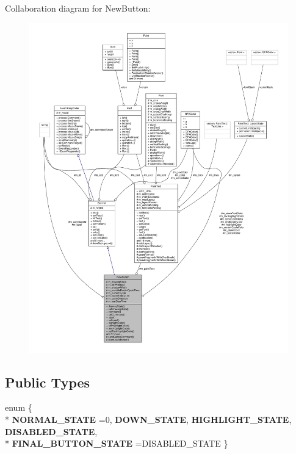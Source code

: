 Collaboration diagram for New\+Button\+:
\nopagebreak
\begin{figure}[H]
\begin{center}
\leavevmode
\includegraphics[width=350pt]{dc/d0e/classNewButton__coll__graph}
\end{center}
\end{figure}
\subsection*{Public Types}
\begin{DoxyCompactItemize}
\item 
enum \{ \\*
{\bfseries N\+O\+R\+M\+A\+L\+\_\+\+S\+T\+A\+TE} =0, 
{\bfseries D\+O\+W\+N\+\_\+\+S\+T\+A\+TE}, 
{\bfseries H\+I\+G\+H\+L\+I\+G\+H\+T\+\_\+\+S\+T\+A\+TE}, 
{\bfseries D\+I\+S\+A\+B\+L\+E\+D\+\_\+\+S\+T\+A\+TE}, 
\\*
{\bfseries F\+I\+N\+A\+L\+\_\+\+B\+U\+T\+T\+O\+N\+\_\+\+S\+T\+A\+TE} =D\+I\+S\+A\+B\+L\+E\+D\+\_\+\+S\+T\+A\+TE
 \}\hypertarget{classNewButton_a810f9a706c5b6cdc18112be25f25d59b}{}\label{classNewButton_a810f9a706c5b6cdc18112be25f25d59b}

\end{DoxyCompactItemize}
